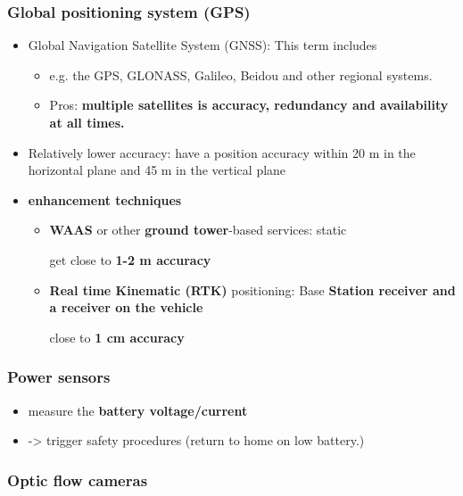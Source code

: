 \documentclass[]{article}
\begin{document}
\subsubsection{Global positioning system (GPS)}\label{header-n2275}

\begin{itemize}
\item
  Global Navigation Satellite System (GNSS): This term includes

  \begin{itemize}
  \item
    e.g. the GPS, GLONASS, Galileo, Beidou and other regional systems. 
  \item
    Pros: \textbf{multiple satellites is accuracy, redundancy and
    availability at all times.}
  \end{itemize}
\item
  Relatively lower accuracy: have a position accuracy within 20 m in the
  horizontal plane and 45 m in the vertical plane
\item
  \textbf{enhancement techniques}

  \begin{itemize}
  \item
    \textbf{WAAS} or other \textbf{ground tower}-based services: static

    get close to \textbf{1-2 m accuracy}
  \item
    \textbf{Real time Kinematic (RTK)} positioning: Base \textbf{Station
    receiver and a receiver on the vehicle}

    close to \textbf{1 cm accuracy}
  \end{itemize}
\end{itemize}

\subsubsection{Power sensors}\label{header-n2295}

\begin{itemize}
\item
  measure the \textbf{battery voltage/current}
\item
  -\textgreater{} trigger safety procedures (return to home on low
  battery.)
\end{itemize}

\subsubsection{Optic flow cameras}\label{header-n2301}
\end{document}
